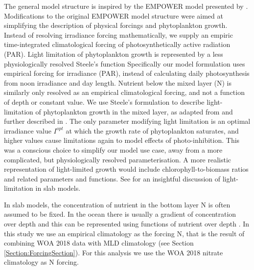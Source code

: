 \documentclass[template.tex]{subfiles}
\begin{document}
The general model structure is inspired by the EMPOWER model presented by \citet{Anderson2015c}. 
Modifications to the original EMPOWER model structure were aimed at simplifying the description of physical forcings and phytoplankton growth.
Instead of resolving irradiance forcing mathematically, we supply an empiric time-integrated climatological forcing of photosynthetically active radiation (PAR). Light limitation of phytoplankton growth is represented by a less physiologically resolved Steele's function 
Specifically our model formulation uses empirical forcing for irradiance (PAR), instead of calculating daily photosynthesis from noon irradiance and day length. Nutrient below the mixed layer  (\unit{N^\emptyset}) is similarly only resolved as an empirical climatological forcing, and not a function of depth or constant value. We use Steele's formulation to describe light-limitation of phytoplankton growth in the mixed layer, as adapted from \citet{Acevedo-Trejos2016} and further described in \citet{Ebenhoh1997}. The only parameter modifying light limitation is an optimal irradiance value $I^{opt}$ at which the growth rate of phytoplankton saturates, and higher values cause limitations again to model effects of photo-inhibition. This was a conscious choice to simplify our model use case, away from a more complicated, but physiologically resolved parameterisation. A more realistic representation of light-limited growth would include chlorophyll-to-biomass ratios and related parameters and functions. See \citet{Anderson2015c} for an insightful discussion of light-limitation in slab models.


In slab models, the concentration of nutrient in the bottom layer \unit{N^\emptyset} is often assumed to be fixed. In the ocean there is usually a gradient of concentration over depth and this can be represented using functions of nutrient over depth \citep{Frost1987GrazingSpp., Fasham1995VariationsAnalysis}. In this study we use an empirical climatology as the forcing \unit{N^\emptyset}, that is the result of combining WOA 2018 data with MLD climatology (see Section \ref{Section:ForcingSection}). For this analysis we use the WOA 2018 nitrate climatology as \unit{N^\emptyset} forcing. 
\end{document}
